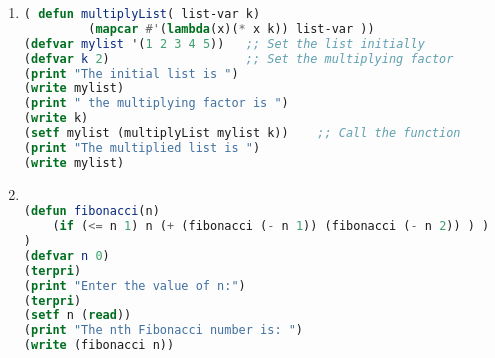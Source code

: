 \documentclass[11pt]{article}
\begin{document}
\begin{enumerate}
\item 
\begin{lstlisting}[language=Lisp,numbers=none]
( defun multiplyList( list-var k)
         (mapcar #'(lambda(x)(* x k)) list-var ))
(defvar mylist '(1 2 3 4 5))   ;; Set the list initially
(defvar k 2)                   ;; Set the multiplying factor
(print "The initial list is ")
(write mylist)
(print " the multiplying factor is ")
(write k)
(setf mylist (multiplyList mylist k))    ;; Call the function
(print "The multiplied list is ")
(write mylist)
\end{lstlisting}

\item
\begin{lstlisting}[language=Lisp,numbers=none]

(defun fibonacci(n)
    (if (<= n 1) n (+ (fibonacci (- n 1)) (fibonacci (- n 2)) ) )
)
(defvar n 0)
(terpri)
(print "Enter the value of n:")
(terpri)
(setf n (read))
(print "The nth Fibonacci number is: ")
(write (fibonacci n))
\end{lstlisting}

\end{enumerate}
\end{document}
